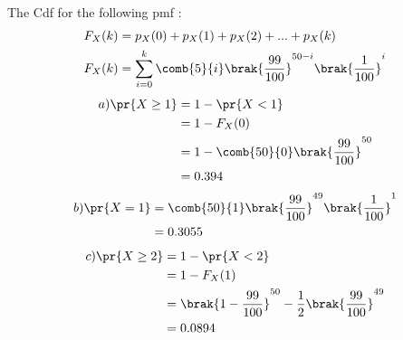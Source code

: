 \documentclass[journal,12pt,twocolumn]{IEEEtran}
\theoremstyle{remark}
\begin{document}
The Cdf for the following pmf :  
\begin{align}
F_X(k) &= p_X(0) + p_X(1) + p_X(2) + ... + p_X(k) \\
F_X(k) &= \sum_{i=0}^{k} \comb{5}{i}\brak{\frac{99}{100}}^{50-i}\brak{\frac{1}{100}}^{i}
\end{align}
  \begin{align}
a)  \pr{X \geq 1} &= 1 - \pr{X < 1} \\
  &= 1 - F_X(0)  \\
  &= 1 - \comb{50}{0}\brak{\frac{99}{100}}^{50} \\
  &= 0.394
 \end{align}
 \begin{align}
b)  \pr{X=1} &= \comb{50}{1}\brak{\frac{99}{100}}^{49}\brak{\frac{1}{100}}^{1} \\
  &= 0.3055
\end{align} 
\begin{align}
c)  \pr{X \geq 2}  &= 1 - \pr{X<2}\\  
   &= 1 - F_X(1) \\
   &= \brak{1 - \frac{99}{100}}^{50} - \frac{1}{2}\brak{\frac{99}{100}}^{49} \\
   &= 0.0894
\end{align}
\end{document}
